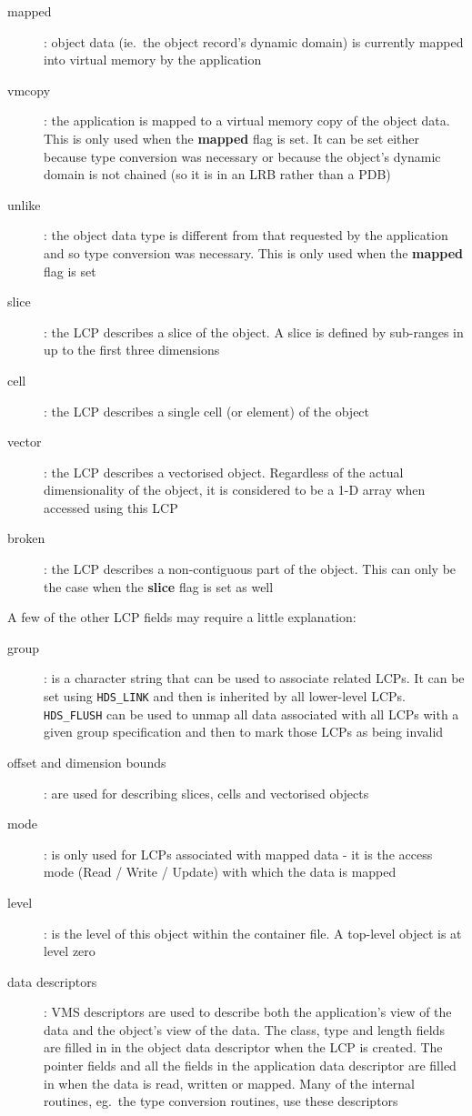 \begin {description}
\item [mapped]: object data (ie.\ the object record's dynamic domain) is
currently mapped into virtual memory by the application
\item [vmcopy]: the application is mapped to a virtual memory copy of the
object data. This is only used when the {\bf mapped} flag is set. It can
be set either because type conversion was necessary or because the object's
dynamic domain is not chained (so it is in an LRB rather than a PDB)
\item [unlike]: the object data type is different from that requested by
the application and so type conversion was necessary. This is only used when
the {\bf mapped} flag is set 
\item [slice]: the LCP describes a slice of the object. A slice is defined by
sub-ranges in up to the first three dimensions 
\item [cell]: the LCP describes a single cell (or element) of the object
\item [vector]: the LCP describes a vectorised object. Regardless of the
actual dimensionality of the object, it is considered to be a 1-D array when
accessed using this LCP
\item [broken]: the LCP describes a non-contiguous part of the object. This
can only be the case when the {\bf slice} flag is set as well
\end {description}

A few of the other LCP fields may require a little explanation:

\begin {description}
\item [group]: is a character string that can be used to associate related
LCPs. It can be set using {\tt HDS\_LINK} and then is inherited by all
lower-level LCPs. {\tt HDS\_FLUSH} can be used to unmap all data associated
with all LCPs with a given group specification and then to mark those LCPs
as being invalid
\item [offset and dimension bounds]: are used for describing slices, cells
and vectorised objects
\item [mode]: is only used for LCPs associated with mapped data - it is
the access mode (Read / Write / Update) with which the data is mapped
\item [level]: is the level of this object within the container file. A
top-level object is at level zero
\item [data descriptors]: VMS descriptors are used to describe both the
application's view of the data and the object's view of the data. The class,
type and length fields are filled in in the object data descriptor when
the LCP is created. The pointer fields and all the fields in the application
data descriptor are filled in when the data is read, written or mapped.
Many of the internal routines, eg.\ the type conversion routines, use these
descriptors
\end {description}

